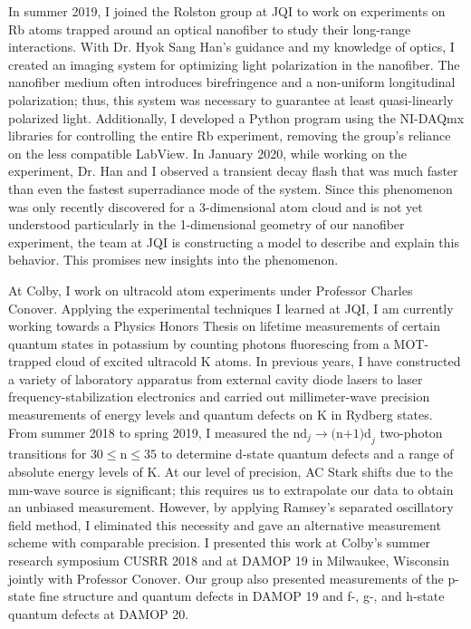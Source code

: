 \documentclass[12pt]{article}
\begin{document}
In summer 2019, I joined the Rolston group at JQI to work on  experiments on Rb atoms trapped around an optical nanofiber to study their long-range interactions. With Dr. Hyok Sang Han's guidance and my knowledge of optics, I created an imaging system for optimizing light polarization in the nanofiber. The nanofiber medium often introduces birefringence and a non-uniform longitudinal polarization; thus, this system was necessary to guarantee at least  quasi-linearly polarized light. Additionally, I developed a Python program using the NI-DAQmx libraries for controlling the entire Rb experiment, removing the group's reliance on the less compatible LabView. In January 2020, while working on the experiment, Dr. Han and I observed a transient decay flash that was much faster than even the fastest superradiance mode of the system. Since this phenomenon was only recently discovered for a 3-dimensional atom cloud and is not yet understood particularly in the 1-dimensional geometry of our nanofiber experiment, the team at JQI is constructing a model to describe and explain this behavior. This promises new insights into the phenomenon.  \\ \vspace{-10pt}

At Colby, I work on ultracold atom experiments under Professor Charles Conover. Applying the experimental techniques I learned at JQI, I am currently working towards a Physics Honors Thesis on lifetime measurements of certain quantum states in potassium by counting photons fluorescing from a MOT-trapped cloud of excited ultracold K atoms. In previous years, I have constructed a variety of laboratory apparatus from external cavity diode lasers to laser frequency-stabilization electronics and carried out millimeter-wave precision measurements of energy levels and quantum defects on K in Rydberg states. From summer 2018 to spring 2019, I measured the $\mbox{nd}_{j} \to \mbox{(n+1)d}_{j}$ two-photon transitions for $\mbox{30} \leq \mbox{n} \leq \mbox{35}$ to determine d-state quantum defects and a range of absolute energy levels of K. At our level of precision, AC Stark shifts due to the mm-wave source is significant; this requires us to extrapolate our data to obtain an unbiased measurement. However, by applying Ramsey's separated oscillatory field method, I eliminated this necessity and gave an alternative measurement scheme with comparable precision. I presented this work at Colby's summer research symposium CUSRR 2018 and at DAMOP 19 in Milwaukee, Wisconsin jointly with Professor Conover. Our group also presented measurements of the p-state fine structure and quantum defects in DAMOP 19 and f-, g-, and h-state quantum defects at DAMOP 20. \\ \vspace{-10pt}
\end{document}
